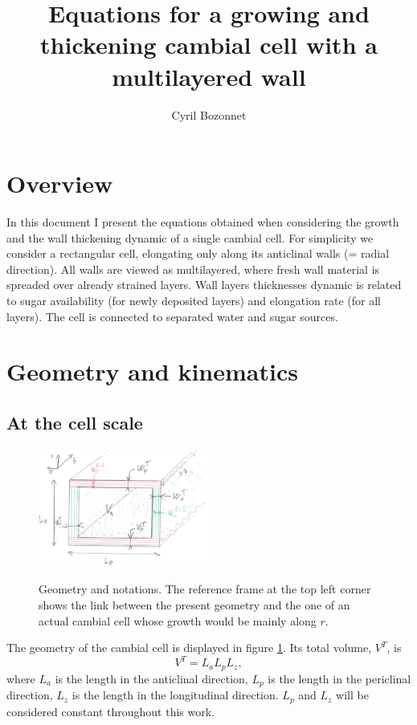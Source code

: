 \documentclass[]{article}
\title{Equations for a growing and thickening cambial cell with a multilayered wall}
\author{Cyril Bozonnet}
\begin{document}
	
\maketitle
\section{Overview}
In this document I present the equations obtained when considering the growth and the wall thickening dynamic of a single cambial cell. For simplicity we consider a rectangular cell, elongating only along its anticlinal walls (= radial direction). All walls are viewed as multilayered, where fresh wall material is spreaded over already strained layers. Wall layers thicknesses dynamic is related to sugar availability (for newly deposited layers) and elongation rate (for all layers). The cell is connected to separated water and sugar sources.

\section{Geometry and kinematics}
\subsection{At the cell scale}

\begin{figure}[h]
	\centering
		 {\includegraphics[width=0.5\textwidth]{schema.png}}
	\caption{Geometry and notations. The reference frame at the top left corner shows the link between the present geometry and the one of an actual cambial cell whose growth would be mainly along $r$.}
	\label{fig1}
\end{figure}
The geometry of the cambial cell is displayed in figure \ref{fig1}. Its total volume, $V^T$, is
\begin{equation}
	V^T = L_aL_pL_z,
\end{equation}
where $L_a$ is the length in the anticlinal direction, $L_p$ is the length in the periclinal direction, $L_z$ is the length in the longitudinal direction. $L_p$ and $L_z$ will be considered constant throughout this work.
\end{document}
